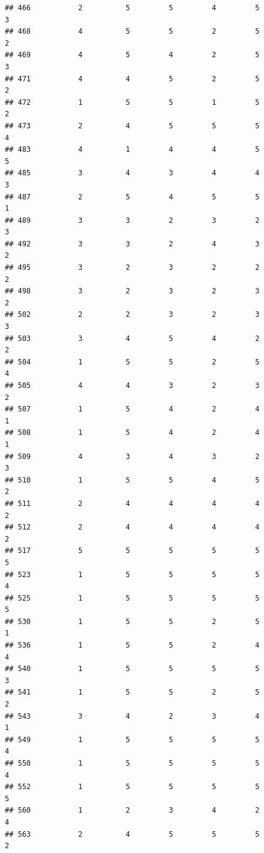 \documentclass[
]{article}
\begin{document}
\begin{verbatim}
## 466           2          5         5         4         5             3
## 468           4          5         5         2         5             2
## 469           4          5         4         2         5             3
## 471           4          4         5         2         5             2
## 472           1          5         5         1         5             2
## 473           2          4         5         5         5             4
## 483           4          1         4         4         5             5
## 485           3          4         3         4         4             3
## 487           2          5         4         5         5             1
## 489           3          3         2         3         2             3
## 492           3          3         2         4         3             2
## 495           3          2         3         2         2             2
## 498           3          2         3         2         3             2
## 502           2          2         3         2         3             3
## 503           3          4         5         4         2             2
## 504           1          5         5         2         5             4
## 505           4          4         3         2         3             2
## 507           1          5         4         2         4             1
## 508           1          5         4         2         4             1
## 509           4          3         4         3         2             3
## 510           1          5         5         4         5             2
## 511           2          4         4         4         4             2
## 512           2          4         4         4         4             2
## 517           5          5         5         5         5             5
## 523           1          5         5         5         5             4
## 525           1          5         5         5         5             5
## 530           1          5         5         2         5             1
## 536           1          5         5         2         4             4
## 540           1          5         5         5         5             3
## 541           1          5         5         2         5             2
## 543           3          4         2         3         4             1
## 549           1          5         5         5         5             4
## 550           1          5         5         5         5             4
## 552           1          5         5         5         5             5
## 560           1          2         3         4         2             4
## 563           2          4         5         5         5             2

\end{verbatim}
\end{document}
